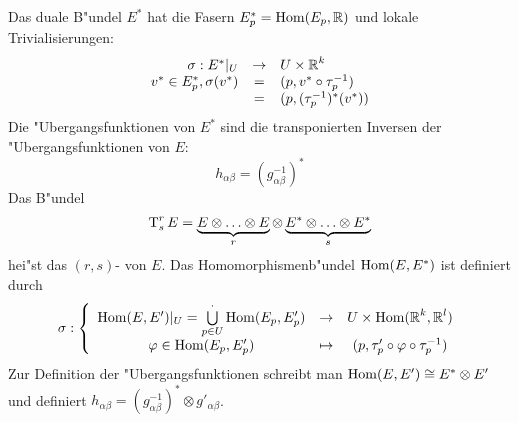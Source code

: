 Das duale B"undel $E^*$ hat die Fasern $E_p^* = \operatorname{Hom}(E_p, \operatorname{\mathbb{R}})$ und lokale Trivialisierungen:
	\[ \begin{array}{rcl} \sigma: E^*|_U &\to& U \times \operatorname{\mathbb{R}}^k\\
	v^* \in E^*_p, \sigma(v^*) &=& (p, v^* \circ \tau_p^{-1}) \\
	&=& (p, (\tau_p^{-1})^*(v^*)) \end{array}\]
Die "Ubergangsfunktionen von $E^*$ sind die transponierten Inversen der "Ubergangsfunktionen von $E$:
	\[ h_{\alpha\beta} = (g_{\alpha\beta}^{-1})^* \]
Das B"undel
	\[ \operatorname{T}_s^r E = \underbrace{E \otimes \ldots \otimes E}_{r} \otimes \underbrace{E^* \otimes \ldots \otimes E^*}_{s} \]
hei"st das $(r,s)$- von $E$. Das Homomorphismenb"undel $\operatorname{Hom}(E,E^*)$ ist definiert durch
	\[ \sigma: \left\{ \begin{array}{ccc} \operatorname{Hom}(E,E')|_U = \bigcup\limits_{p \in U}^{\cdot} \operatorname{Hom}(E_p, E_p') &\to& U \times \operatorname{Hom}(\operatorname{\mathbb{R}}^k, \operatorname{\mathbb{R}}^l)\\
		\varphi \in \operatorname{Hom}(E_p, E'_p) &\mapsto& (p, \tau'_p \circ \varphi \circ \tau_p^{-1}) \end{array} \right. \]
Zur Definition der "Ubergangsfunktionen schreibt man $\operatorname{Hom}(E, E') \cong E^* \otimes E'$ und definiert $h_{\alpha\beta} = (g_{\alpha\beta}^{-1})^* \otimes g'_{\alpha\beta}$.
\begin{center}\end{center}

